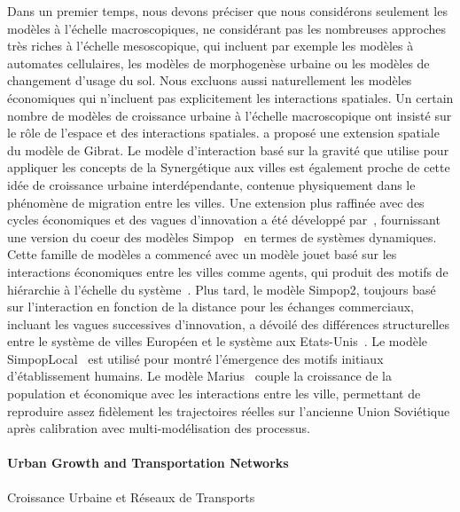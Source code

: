 {Dans un premier temps, nous devons préciser que nous considérons seulement les modèles à l'échelle macroscopiques, ne considérant pas les nombreuses approches très riches à l'échelle mesoscopique, qui incluent par exemple les modèles à automates cellulaires, les modèles de morphogenèse urbaine ou les modèles de changement d'usage du sol. Nous excluons aussi naturellement les modèles économiques qui n'incluent pas explicitement les interactions spatiales. Un certain nombre de modèles de croissance urbaine à l'échelle macroscopique ont insisté sur le rôle de l'espace et des interactions spatiales. \cite{bretagnolle2000long} a proposé une extension spatiale du modèle de Gibrat. Le modèle d'interaction basé sur la gravité que \cite{sanders1992systeme} utilise pour appliquer les concepts de la Synergétique aux villes est également proche de cette idée de croissance urbaine interdépendante, contenue physiquement dans le phénomène de migration entre les villes. Une extension plus raffinée avec des cycles économiques et des vagues d'innovation a été développé par~\cite{favaro2011gibrat}, fournissant une version du coeur des modèles Simpop~\cite{pumain2012multi} en termes de systèmes dynamiques. Cette famille de modèles a commencé avec un modèle jouet basé sur les interactions économiques entre les villes comme agents, qui produit des motifs de hiérarchie à l'échelle du système~\cite{sanders1997simpop}. Plus tard, le modèle Simpop2, toujours basé sur l'interaction en fonction de la distance pour les échanges commerciaux, incluant les vagues successives d'innovation, a dévoilé des différences structurelles entre le système de villes Européen et le système aux Etats-Unis~\cite{bretagnolle2010comparer}. Le modèle SimpopLocal~\cite{pumain2017simpoplocal} est utilisé pour montré l'émergence des motifs initiaux d'établissement humains. Le modèle Marius~\cite{cottineau2014evolution} couple la croissance de la population et économique avec les interactions entre les ville, permettant de reproduire assez fidèlement les trajectoires réelles sur l'ancienne Union Soviétique après calibration avec multi-modélisation des processus.
}


\paragraph{Urban Growth and Transportation Networks}{Croissance Urbaine et Réseaux de Transports}


